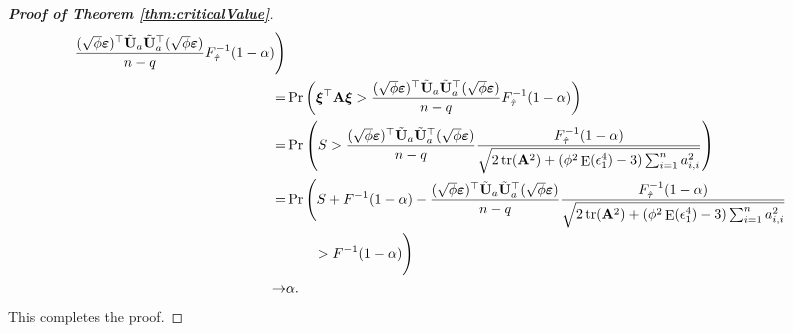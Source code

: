 \documentclass[11pt]{article}
\DeclareMathOperator{\mytr}{tr}
\DeclareMathOperator{\myE}{E}
\newcommand{\BA}{\mathbf{A}}    \newcommand{\BB}{\mathbf{B}}    \newcommand{\BC}{\mathbf{C}}    \newcommand{\BD}{\mathbf{D}}    \newcommand{\BE}{\mathbf{E}}    \newcommand{\BF}{\mathbf{F}}    \newcommand{\BG}{\mathbf{G}}    \newcommand{\BH}{\mathbf{H}}    \newcommand{\BI}{\mathbf{I}}    \newcommand{\BJ}{\mathbf{J}}    \newcommand{\BK}{\mathbf{K}}    \newcommand{\BL}{\mathbf{L}}
\newcommand{\bfsym}[1]{\ensuremath{\boldsymbol{#1}}}
\def\bxi{\bfsym {\xi}}
\theoremstyle{plain}
\theoremstyle{definition}
\theoremstyle{remark}
\begin{document}
\begin{appendices}
\begin{proof}[\textbf{Proof of Theorem \ref{thm:criticalValue}}]
\begin{align*}
            \frac{
            (\sqrt \phi \bepsilon)^\top \tilde \BU_a  \tilde \BU_a^\top (\sqrt \phi \bepsilon)
}{n-q} F^{-1}_{\hat \tau} (1-\alpha)
\Bigg)
            \\
            =&
            \Pr \left( \bxi^\top \BA \bxi  
                >
                \frac{
            (\sqrt \phi \bepsilon)^\top \tilde \BU_a  \tilde \BU_a^\top (\sqrt \phi \bepsilon)
}{n-q}
                F^{-1}_{\hat \tau} (1-\alpha)
            \right)
            \\
            =&
            \Pr \left( S> 
\frac{
            (\sqrt \phi \bepsilon)^\top \tilde \BU_a  \tilde \BU_a^\top (\sqrt \phi \bepsilon)
}{n-q}
            \frac{F^{-1}_{\hat \tau} (1-\alpha)}{
            \sqrt{
    2 \mytr(\BA^2)
    +
    ( \phi^2 \myE (\epsilon_1^4)-3) \sum_{i=1}^n a_{i,i}^2
            }             
    }
             \right) 
             \\
            =& 
            \Pr \Bigg( S+F^{-1}(1-\alpha)-
\frac{
            (\sqrt \phi \bepsilon)^\top \tilde \BU_a  \tilde \BU_a^\top (\sqrt \phi \bepsilon)
}{n-q}
            \frac{F^{-1}_{\hat \tau} (1-\alpha)}{
            \sqrt{
    2 \mytr(\BA^2)
    +
    ( \phi^2 \myE (\epsilon_1^4)-3) \sum_{i=1}^n a_{i,i}^2
            }             
    }
    \\
    &\quad \quad>F^{-1}(1-\alpha)
             \Bigg) 
             \\
             \to&  \alpha
             .
\end{align*}
This completes the proof.

\end{proof}




\end{appendices}
\end{document}
